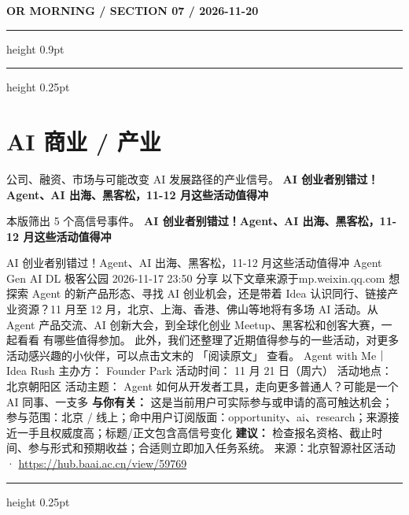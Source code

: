 \documentclass[10.5pt]{ctexart}
\begin{document}
\newpage
{\small\bfseries OR MORNING / SECTION 07 / 2026-11-20}
\vspace{2mm}
\hrule height 0.9pt
\vspace{1.5mm}
\hrule height 0.25pt
\vspace{4mm}
\section*{AI 商业 / 产业}
{\color{ormuted} 公司、融资、市场与可能改变 AI 发展路径的产业信号。}
\vspace{2mm}
{\LARGE\bfseries AI 创业者别错过！Agent、AI 出海、黑客松，11-12 月这些活动值得冲}\par
\vspace{1mm}
{\color{ormuted} 本版筛出 5 个高信号事件。}
\vspace{3mm}
{\Large\bfseries AI 创业者别错过！Agent、AI 出海、黑客松，11-12 月这些活动值得冲}\par
AI 创业者别错过！Agent、AI 出海、黑客松，11-12 月这些活动值得冲 Agent Gen AI DL 极客公园 2026-11-17 23:50 分享 以下文章来源于mp.weixin.qq.com 想探索 Agent 的新产品形态、寻找 AI 创业机会，还是带着 Idea 认识同行、链接产业资源？11 月至 12 月，北京、上海、香港、佛山等地将有多场 AI 活动。从 Agent 产品交流、AI 创新大会，到全球化创业 Meetup、黑客松和创客大赛，一起看看 有哪些值得参加。 此外，我们还整理了近期值得参与的一些活动，对更多活动感兴趣的小伙伴，可以点击文末的 「阅读原文」 查看。 Agent with Me｜Idea Rush 主办方： Founder Park 活动时间： 11 月 21 日（周六） 活动地点： 北京朝阳区 活动主题： Agent 如何从开发者工具，走向更多普通人？可能是一个 AI 同事、一支多
\textbf{与你有关：} 这是当前用户可实际参与或申请的高可触达机会；参与范围：北京 / 线上；命中用户订阅版面：opportunity、ai、research；来源接近一手且权威度高；标题/正文包含高信号变化
\textbf{建议：} 检查报名资格、截止时间、参与形式和预期收益；合适则立即加入任务系统。
{\footnotesize\color{ormuted} 来源：北京智源社区活动 · \url{https://hub.baai.ac.cn/view/59769}}
\vspace{4mm}
\hrule height 0.25pt
\vspace{3mm}
\end{document}

